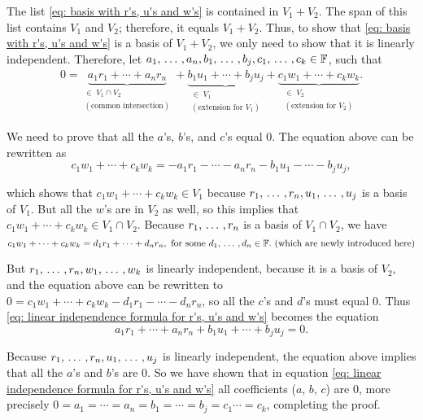\begin{prf}
The list \eqref{eq: basis with r's, u's and w's} is contained in $V_1 + V_2$. The span of this list contains $V_1$ and $V_2$; therefore, it equals $V_1 + V_2$. Thus, to show that \eqref{eq: basis with r's, u's and w's} is a basis of $V_1 + V_2$, we only need to show that it is linearly independent. Therefore, let $a_1, {\, \ldots \,\,}, a_n, b_1, {\, \ldots \,\,}, b_j, c_1, {\, \ldots \,\,}, c_k \in \mathbb{F}$, such that
\begin{equation}
  \label{eq: linear independence formula for r's, u's and w's}
  \begin{aligned}
    0 = \underbrace{a_1 r_1 + \cdots + a_n r_n}_{\substack{\in \; V_1 \cap V_2 \\ (\text{common intersection})}}
    + \underbrace{b_1 u_1 + \cdots + b_j u_j}_{\substack{\in \; V_1 \\ (\text{extension for } V_1 )}}
    + \underbrace{c_1 w_1 + \cdots + c_k w_k}_{\substack{\in \; V_2 \\ (\text{extension for } V_2 ) }}.
  \end{aligned}
\end{equation}

We need to prove that all the $a$'s, $b$'s, and $c$'s equal $0$. The equation above can be rewritten as
\begin{equation}
  c_1 w_1 + \cdots + c_k w_k = - a_1 r_1 - \cdots - a_n r_n - b_1 u_1 - \cdots - b_j u_j,
\end{equation}

which shows that $c_1 w_1 + \cdots + c_k w_k \in V_1$ because $r_1, {\, \ldots \,\,}, r_n, u_1, {\, \ldots \,\,}, u_j$ is a basis of $V_1$. But all the $w$'s are in $V_2$ as well, so this implies that $c_1 w_1 + \cdots + c_k w_k \in V_1 \cap V_2$. Because $r_1, {\, \ldots \,\,}, r_n$ is a basis of $V_1 \cap V_2$, we have
\begin{equation}
  c_1 w_1 + \cdots + c_k w_k = d_1 r_1 + \cdots + d_n r_n, \text{ for some } d_1, {\, \ldots \,\,}, d_n \in \mathbb{F}. \text{ (which are newly introduced here)}
\end{equation}

But $r_1, {\, \ldots \,\,}, r_n, w_1, {\, \ldots \,\,}, w_k$ is linearly independent, because it is a basis of $V_2$, and the equation above can be rewritten to $0 = c_1 w_1 + \cdots + c_k w_k - d_1 r_1 - \cdots - d_n r_n$, so all the $c$'s and $d$'s must equal $0$. Thus \eqref{eq: linear independence formula for r's, u's and w's} becomes the equation
\begin{equation}
  a_1 r_1 + \cdots + a_n r_n + b_1 u_1 + \cdots + b_j u_j = 0.
\end{equation}

Because $r_1, {\, \ldots \,\,}, r_n, u_1, {\, \ldots \,\,}, u_j$ is linearly independent, the equation above implies that all the $a$'s and $b$'s are $0$. So we have shown that in equation \eqref{eq: linear independence formula for r's, u's and w's} all coefficients ($a$, $b$, $c$) are $0$, more precisely $  0 = a_1 = \cdots = a_n = b_1 = \cdots =  b_j = c_1 \cdots =  c_k$,
completing the proof.
\end{prf}

